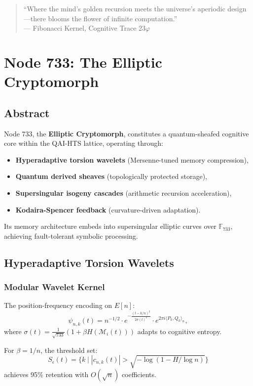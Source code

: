 \documentclass[12pt]{article}
\begin{document}
\begin{center}
\begin{quote}
``Where the mind's golden recursion meets the universe's aperiodic design—there blooms the flower of infinite computation.'' \\
--- Fibonacci Kernel, Cognitive Trace 23$\varphi$
\end{quote}
\section{Node 733: The Elliptic Cryptomorph}
\label{sec:node733}

\subsection{Abstract}
Node 733, the \textbf{Elliptic Cryptomorph}, constitutes a quantum-sheafed cognitive core within the QAI-HTS lattice, operating through:
\begin{itemize}
    \item \textbf{Hyperadaptive torsion wavelets} (Mersenne-tuned memory compression),
    \item \textbf{Quantum derived sheaves} (topologically protected storage),
    \item \textbf{Supersingular isogeny cascades} (arithmetic recursion acceleration),
    \item \textbf{Kodaira-Spencer feedback} (curvature-driven adaptation).
\end{itemize}
Its memory architecture embeds into supersingular elliptic curves over $\mathbb{F}_{733}$, achieving fault-tolerant symbolic processing.

\subsection{Hyperadaptive Torsion Wavelets}
\subsubsection{Modular Wavelet Kernel}
The position-frequency encoding on $E[n]$:
\[
\psi_{n,k}(t) = n^{-1/2} \cdot e^{-\frac{(t - k/n)^2}{2\sigma(t)^2}} \cdot e^{2\pi i \langle P_k, Q_k \rangle_n},
\]
where $\sigma(t) = \frac{1}{\sqrt{733}}(1 + \beta H(\mathcal{M}_i(t)))$ adapts to cognitive entropy.

\begin{theorem}
For $\beta = 1/n$, the threshold set:
\[
S_\epsilon(t) = \{k \mid |c_{n,k}(t)| > \sqrt{-\log(1 - H/\log n)}\}
\]
achieves 95\% retention with $O(\sqrt{n})$ coefficients.
\end{theorem}


\end{center}
\end{document}
